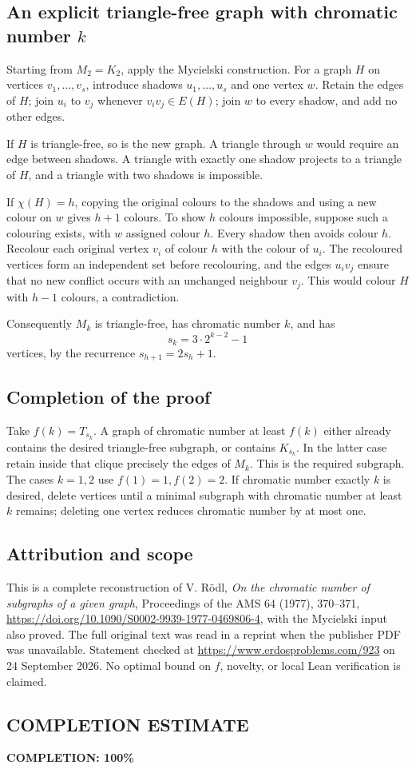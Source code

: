 \subsection*{An explicit triangle-free graph with chromatic number \(k\)}
Starting from \(M_2=K_2\), apply the Mycielski construction. For a graph \(H\) on vertices \(v_1,\ldots,v_s\), introduce shadows \(u_1,\ldots,u_s\) and one vertex \(w\). Retain the edges of \(H\); join \(u_i\) to \(v_j\) whenever \(v_iv_j\in E(H)\); join \(w\) to every shadow, and add no other edges.

If \(H\) is triangle-free, so is the new graph. A triangle through \(w\) would require an edge between shadows. A triangle with exactly one shadow projects to a triangle of \(H\), and a triangle with two shadows is impossible.

If \(\chi(H)=h\), copying the original colours to the shadows and using a new colour on \(w\) gives \(h+1\) colours. To show \(h\) colours impossible, suppose such a colouring exists, with \(w\) assigned colour \(h\). Every shadow then avoids colour \(h\). Recolour each original vertex \(v_i\) of colour \(h\) with the colour of \(u_i\). The recoloured vertices form an independent set before recolouring, and the edges \(u_iv_j\) ensure that no new conflict occurs with an unchanged neighbour \(v_j\). This would colour \(H\) with \(h-1\) colours, a contradiction.

Consequently \(M_k\) is triangle-free, has chromatic number \(k\), and has
\[
s_k=3\cdot2^{k-2}-1
\]
vertices, by the recurrence \(s_{h+1}=2s_h+1\).

\subsection*{Completion of the proof}
Take \(f(k)=T_{s_k}\). A graph of chromatic number at least \(f(k)\) either already contains the desired triangle-free subgraph, or contains \(K_{s_k}\). In the latter case retain inside that clique precisely the edges of \(M_k\). This is the required subgraph. The cases \(k=1,2\) use \(f(1)=1,f(2)=2\). If chromatic number exactly \(k\) is desired, delete vertices until a minimal subgraph with chromatic number at least \(k\) remains; deleting one vertex reduces chromatic number by at most one.

\subsection*{Attribution and scope}
This is a complete reconstruction of V. R\"odl, \emph{On the chromatic number of subgraphs of a given graph}, Proceedings of the AMS 64 (1977), 370--371, \url{https://doi.org/10.1090/S0002-9939-1977-0469806-4}, with the Mycielski input also proved. The full original text was read in a reprint when the publisher PDF was unavailable. Statement checked at \url{https://www.erdosproblems.com/923} on 24 September 2026. No optimal bound on \(f\), novelty, or local Lean verification is claimed.
\subsection*{COMPLETION ESTIMATE}
\textbf{COMPLETION: 100\%}
